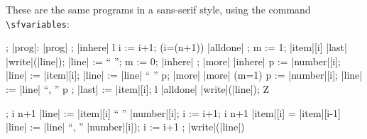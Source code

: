 \documentclass{article}
\begin{document}
These are the same programs in a sans-serif style, using the command
\verb:\sfvariables::
\sfvariables
\begin{program}
 \VAR {}; 
 \ACTIONS |prog|: 
|prog| \ACTIONEQ %
    ;
    \CALL |inhere| \ENDACTION
l \ACTIONEQ %
    i := i+1; 
    \IF (i=(n+1)) \THEN \CALL |alldone| \FI ; 
    m := 1; 
    \IF |item|[i] \neq |last|
	\THEN |write|(|line|); |line| := `` ''; m := 0;
	      \CALL |inhere| \FI ; 
    \CALL |more| \ENDACTION
|inhere| \ACTIONEQ %
    p := |number|[i]; |line| := |item|[i];
    |line| := |line| \concat `` '' \concat p;
    \CALL |more| \ENDACTION
|more| \ACTIONEQ %
    \IF (m=1) \THEN p := |number|[i];
    |line| := |line| \concat ``, '' \concat p \FI ; 
    |last| := |item|[i]; 
    \CALL l  \ENDACTION  
|alldone| \ACTIONEQ |write|(|line|); \CALL Z \ENDACTION \ENDACTIONS \END 
\end{program} 

\begin{program}
; 
\WHILE i \neq n+1 \DO 
  |line| := |item|[i] \concat `` '' \concat |number|[i]; 
  i := i+1; 
  \WHILE i \neq n+1 \AND |item|[i] = |item|[i-1] \DO 
    |line| := |line| \concat ``, '' \concat |number|[i]);
    i := i+1 \OD ; 
  |write|(|line|) \OD 
\end{program}
\end{document}

